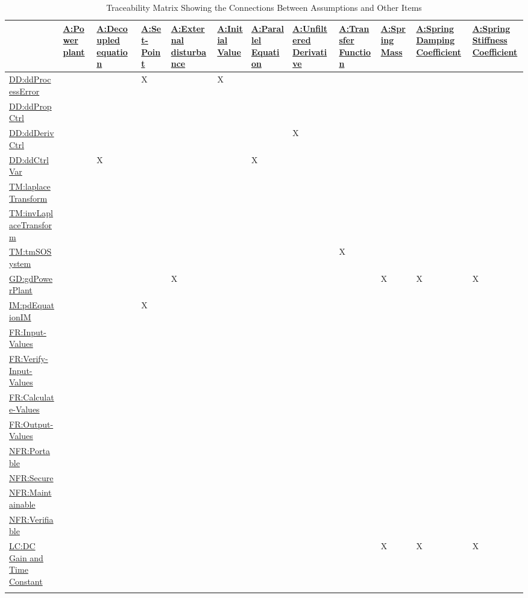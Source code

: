 \documentclass[12pt]{article}
\begin{document}
\begin{longtable}{l l l l l l l l l l l l}
\toprule
\textbf{} & \textbf{\hyperref[pwrPlant]{A:Power plant}} & \textbf{\hyperref[decoupled]{A:Decoupled equation}} & \textbf{\hyperref[setPoint]{A:Set-Point}} & \textbf{\hyperref[externalDisturb]{A:External disturbance}} & \textbf{\hyperref[initialValue]{A:Initial Value}} & \textbf{\hyperref[parallelEq]{A:Parallel Equation}} & \textbf{\hyperref[unfilteredDerivative]{A:Unfiltered Derivative}} & \textbf{\hyperref[pwrPlantTxFnx]{A:Transfer Function}} & \textbf{\hyperref[massSpring]{A:Spring Mass}} & \textbf{\hyperref[dampingCoeffSpring]{A:Spring Damping Coefficient}} & \textbf{\hyperref[stiffnessCoeffSpring]{A:Spring Stiffness Coefficient}}
\\
\midrule
\endhead
\hyperref[DD:ddProcessError]{DD:ddProcessError} &  &  & X &  & X &  &  &  &  &  & 
\\
\hyperref[DD:ddPropCtrl]{DD:ddPropCtrl} &  &  &  &  &  &  &  &  &  &  & 
\\
\hyperref[DD:ddDerivCtrl]{DD:ddDerivCtrl} &  &  &  &  &  &  & X &  &  &  & 
\\
\hyperref[DD:ddCtrlVar]{DD:ddCtrlVar} &  & X &  &  &  & X &  &  &  &  & 
\\
\hyperref[TM:laplaceTransform]{TM:laplaceTransform} &  &  &  &  &  &  &  &  &  &  & 
\\
\hyperref[TM:invLaplaceTransform]{TM:invLaplaceTransform} &  &  &  &  &  &  &  &  &  &  & 
\\
\hyperref[TM:tmSOSystem]{TM:tmSOSystem} &  &  &  &  &  &  &  & X &  &  & 
\\
\hyperref[GD:gdPowerPlant]{GD:gdPowerPlant} &  &  &  & X &  &  &  &  & X & X & X
\\
\hyperref[IM:pdEquationIM]{IM:pdEquationIM} &  &  & X &  &  &  &  &  &  &  & 
\\
\hyperref[inputValues]{FR:Input-Values} &  &  &  &  &  &  &  &  &  &  & 
\\
\hyperref[verifyInputs]{FR:Verify-Input-Values} &  &  &  &  &  &  &  &  &  &  & 
\\
\hyperref[calculateValues]{FR:Calculate-Values} &  &  &  &  &  &  &  &  &  &  & 
\\
\hyperref[outputValues]{FR:Output-Values} &  &  &  &  &  &  &  &  &  &  & 
\\
\hyperref[portability]{NFR:Portable} &  &  &  &  &  &  &  &  &  &  & 
\\
\hyperref[security]{NFR:Secure} &  &  &  &  &  &  &  &  &  &  & 
\\
\hyperref[maintainability]{NFR:Maintainable} &  &  &  &  &  &  &  &  &  &  & 
\\
\hyperref[verifiability]{NFR:Verifiable} &  &  &  &  &  &  &  &  &  &  & 
\\
\hyperref[likeChgPP]{LC:DC Gain and Time Constant} &  &  &  &  &  &  &  &  & X & X & X
\\
\bottomrule
\caption{Traceability Matrix Showing the Connections Between Assumptions and Other Items}
\label{Table:TraceMatAvsAll}
\end{longtable}
\end{document}
